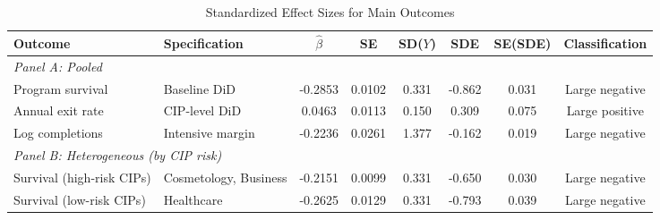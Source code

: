 \begin{table}[H]
\centering
\caption{Standardized Effect Sizes for Main Outcomes}
\label{tab:sde}
\begin{minipage}{\textwidth}
\begin{threeparttable}
\begin{adjustbox}{max width=\textwidth}
\begin{tabular}{llcccccc}
\toprule
Outcome & Specification & $\hat{\beta}$ & SE & SD($Y$) & SDE & SE(SDE) & Classification \\
\midrule
\multicolumn{8}{l}{\textit{Panel A: Pooled}} \\
Program survival & Baseline DiD & -0.2853 & 0.0102 & 0.331 & -0.862 & 0.031 & Large negative \\
Annual exit rate & CIP-level DiD & 0.0463 & 0.0113 & 0.150 & 0.309 & 0.075 & Large positive \\
Log completions & Intensive margin & -0.2236 & 0.0261 & 1.377 & -0.162 & 0.019 & Large negative \\
\midrule
\multicolumn{8}{l}{\textit{Panel B: Heterogeneous (by CIP risk)}} \\
Survival (high-risk CIPs) & Cosmetology, Business & -0.2151 & 0.0099 & 0.331 & -0.650 & 0.030 & Large negative \\
Survival (low-risk CIPs) & Healthcare & -0.2625 & 0.0129 & 0.331 & -0.793 & 0.039 & Large negative \\
\bottomrule
\end{tabular}
\end{adjustbox}
\end{threeparttable}
\par\vspace{0.5em}

\end{minipage}
\end{table}
